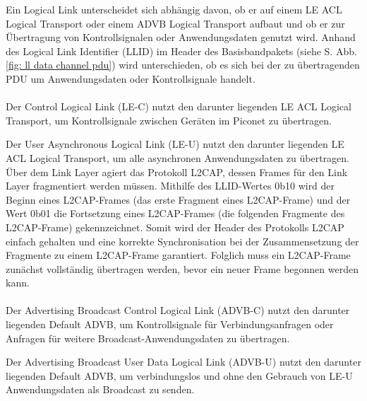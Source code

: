 Ein Logical Link unterscheidet sich abhängig davon, ob er auf einem LE ACL Logical Transport oder einem ADVB Logical Transport aufbaut und ob er zur Übertragung von Kontrollsignalen oder Anwendungsdaten genutzt wird. Anhand des Logical Link Identifier (LLID) im Header des Basisbandpakets (siehe S. \pageref{fig: ll data channel pdu} Abb. \ref{fig: ll data channel pdu}) wird unterschieden, ob es sich bei der zu übertragenden PDU um Anwendungsdaten oder Kontrollsignale handelt.
\\\\
Der Control Logical Link (LE-C) nutzt den darunter liegenden LE ACL Logical Transport, um Kontrollsignale zwischen Geräten im Piconet zu übertragen.

Der User Asynchronous Logical Link (LE-U) nutzt den darunter liegenden LE ACL Logical Transport, um alle asynchronen Anwendungsdaten zu übertragen. Über dem Link Layer agiert das Protokoll L2CAP, dessen Frames für den Link Layer fragmentiert werden müssen. Mithilfe des LLID-Wertes 0b10 wird der Beginn eines L2CAP-Frames (das erste Fragment eines L2CAP-Frame) und der Wert 0b01 die Fortsetzung eines L2CAP-Frames (die folgenden Fragmente des L2CAP-Frame) gekennzeichnet. Somit wird der Header des Protokolls L2CAP einfach gehalten und eine korrekte Synchronisation bei der Zusammensetzung der Fragmente zu einem L2CAP-Frame garantiert. Folglich muss ein L2CAP-Frame zunächst vollständig übertragen werden, bevor ein neuer Frame begonnen werden kann. \cite{BtSpec4.0_176-177}
\\\\
Der Advertising Broadcast Control Logical Link (ADVB-C) nutzt den darunter liegenden Default ADVB, um Kontrollsignale für Verbindungsanfragen oder Anfragen für weitere Broadcast-Anwendungsdaten zu übertragen.

Der Advertising Broadcast User Data Logical Link (ADVB-U) nutzt den darunter liegenden Default ADVB, um verbindungslos und ohne den Gebrauch von LE-U Anwendungsdaten als Broadcast zu senden. \cite{BtSpec4.0_176-177}
